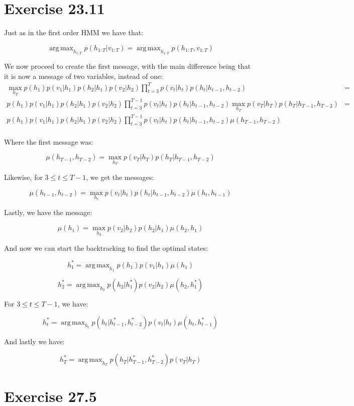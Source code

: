 \documentclass[11pt,a4paper,oneside]{report}
\DeclareMathOperator*{\argmax}{arg\,max}
\begin{document}
\section*{Exercise 23.11}

Just as in the first order HMM we have that:

$$\argmax_{h_{1:T}}p(h_{1:T}|v_{1:T})=\argmax_{h_{1:T}}p(h_{1:T},v_{1:T})$$

We now proceed to create the first message, with the main difference being that it is now a message of two variables, instead of one:
\begin{align*}
\max_{h_T}p(h_1)p(v_1|h_1)p(h_2|h_1)p(v_2|h_2)\prod_{t=3}^Tp(v_t|h_t)p(h_t|h_{t-1},h_{t-2})&=\\
p(h_1)p(v_1|h_1)p(h_2|h_1)p(v_2|h_2)\prod_{t=3}^{T-1}p(v_t|h_t)p(h_t|h_{t-1},h_{t-2})\max_{h_T}p(v_T|h_T)p(h_T|h_{T-1},h_{T-2})&=\\
p(h_1)p(v_1|h_1)p(h_2|h_1)p(v_2|h_2)\prod_{t=3}^{T-1}p(v_t|h_t)p(h_t|h_{t-1},h_{t-2})\mu(h_{T-1},h_{T-2})&\\
\end{align*}

Where the first message was:

$$\mu(h_{T-1},h_{T-2})=\max_{h_T}p(v_T|h_T)p(h_T|h_{T-1},h_{T-2})$$

Likewise, for $3 \leq t \leq T-1$, we get the messages:

$$\mu(h_{t-1},h_{t-2})=\max_{h_t}p(v_t|h_t)p(h_t|h_{t-1},h_{t-2})\mu(h_t,h_{t-1})$$

Lastly, we have the message:

$$\mu(h_1)=\max_{h_2}p(v_2|h_2)p(h_2|h_1)\mu(h_2,h_1)$$

And now we can start the backtracking to find the optimal states:

$$h_1^\ast=\argmax_{h_1}p(h_1)p(v_1|h_1)\mu(h_1)$$

$$h_2^\ast=\argmax_{h_2}p(h_2|h_1^\ast)p(v_2|h_2)\mu(h_2,h_1^\ast)$$

For $3 \leq t \leq T-1$, we have:

$$h_t^\ast=\argmax_{h_t}p(h_t|h_{t-1}^\ast,h_{t-2}^\ast)p(v_t|h_t)\mu(h_t,h_{t-1}^\ast)$$

And lastly we have:

$$h_T^\ast=\argmax_{h_T}p(h_T|h_{T-1}^\ast,h_{T-2}^\ast)p(v_T|h_T)$$

\section*{Exercise 27.5}
\end{document}

